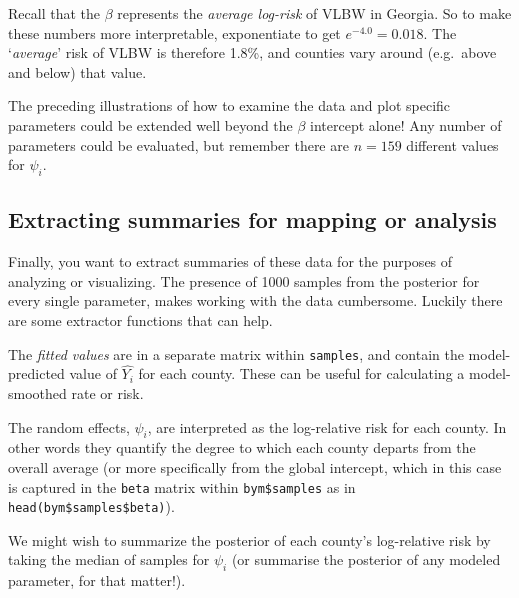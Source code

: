 \documentclass[
]{book}
\newenvironment{Shaded}{\begin{snugshade}}{\end{snugshade}}
\newcommand{\FunctionTok}[1]{\textcolor[rgb]{0.13,0.29,0.53}{\textbf{#1}}}
\newcommand{\NormalTok}[1]{#1}
\newcommand{\OtherTok}[1]{\textcolor[rgb]{0.56,0.35,0.01}{#1}}
\newcommand{\SpecialCharTok}[1]{\textcolor[rgb]{0.81,0.36,0.00}{\textbf{#1}}}
\begin{document}
Recall that the \(\beta\) represents the \emph{average log-risk} of VLBW in Georgia. So to make these numbers more interpretable, exponentiate to get \(e^{-4.0} = 0.018\). The `\emph{average}' risk of VLBW is therefore 1.8\%, and counties vary around (e.g.~above and below) that value.

The preceding illustrations of how to examine the data and plot specific parameters could be extended well beyond the \(\beta\) intercept alone! Any number of parameters could be evaluated, but remember there are \(n=159\) different values for \(\psi_i\).

\hypertarget{extracting-summaries-for-mapping-or-analysis}{%
\subsection{Extracting summaries for mapping or analysis}\label{extracting-summaries-for-mapping-or-analysis}}

Finally, you want to extract summaries of these data for the purposes of analyzing or visualizing. The presence of 1000 samples from the posterior for every single parameter, makes working with the data cumbersome. Luckily there are some extractor functions that can help.

The \emph{fitted values} are in a separate matrix within \texttt{samples}, and contain the model-predicted value of \(\hat{Y_i}\) for each county. These can be useful for calculating a model-smoothed rate or risk.

\begin{Shaded}
\end{Shaded}

The random effects, \(\psi_i\), are interpreted as the log-relative risk for each county. In other words they quantify the degree to which each county departs from the overall average (or more specifically from the global intercept, which in this case is captured in the \texttt{beta} matrix within \texttt{bym\$samples} as in \texttt{head(bym\$samples\$beta)}).

We might wish to summarize the posterior of each county's log-relative risk by taking the median of samples for \(\psi_i\) (or summarise the posterior of any modeled parameter, for that matter!).
\end{document}
